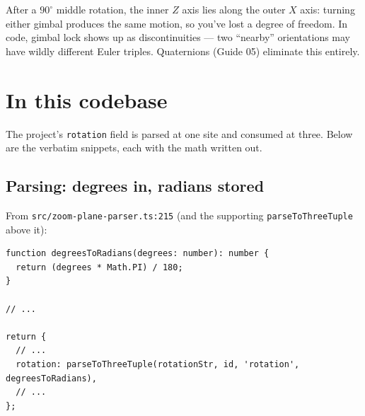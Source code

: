 \documentclass{article}
\begin{document}
\begin{center}
\end{center}

\noindent After a $90^\circ$ middle rotation, the inner $Z$ axis lies along
the outer $X$ axis: turning either gimbal produces the same motion, so
you've lost a degree of freedom. In code, gimbal lock shows up as
discontinuities --- two ``nearby'' orientations may have wildly different
Euler triples. Quaternions (Guide 05) eliminate this entirely.

\section{In this codebase}

The project's \lstinline|rotation| field is parsed at one site and consumed
at three. Below are the verbatim snippets, each with the math written out.

\subsection{Parsing: degrees in, radians stored}

From \texttt{src/zoom-plane-parser.ts:215} (and the supporting
\lstinline|parseToThreeTuple| above it):

\begin{lstlisting}[caption={zoom-plane-parser.ts (excerpt)}]
function degreesToRadians(degrees: number): number {
  return (degrees * Math.PI) / 180;
}

// ...

return {
  // ...
  rotation: parseToThreeTuple(rotationStr, id, 'rotation', degreesToRadians),
  // ...
};
\end{lstlisting}
\end{document}
